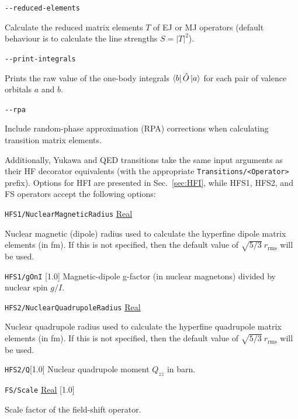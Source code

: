 \documentclass{report}
\begin{document}
\texttt{{-}{-}reduced-elements} 
\begin{adjustwidth}{1cm}{}
Calculate the reduced matrix elements $T$ of EJ or MJ operators (default behaviour is to calculate the line strengths 
$S = |T|^2$).
\end{adjustwidth}

\texttt{{-}{-}print-integrals} 
\begin{adjustwidth}{1cm}{}
Prints the raw value of the one-body integrals $\bra{b}\hat{O}\ket{a}$ for each pair of valence 
orbitals $a$ and $b$.
\end{adjustwidth}

\texttt{{-}{-}rpa}
\begin{adjustwidth}{1cm}{}
Include random-phase approximation (RPA) corrections when calculating transition matrix elements. 
\end{adjustwidth}

Additionally, Yukawa and QED transitions take the same input arguments as their HF decorator equivalents (with the appropriate \hbox{\texttt{Transitions/\textless{Operator}\textgreater}} prefix). Options for HFI are presented in Sec.~\ref{sec:HFI}, while HFS1, HFS2, and FS operators accept the following options:

\texttt{HFS1/NuclearMagneticRadius} \uline{Real}
\begin{adjustwidth}{1cm}{}
Nuclear magnetic (dipole) radius used to calculate the hyperfine dipole matrix elements (in fm). If this is not
specified, then the default value of $\sqrt{5/3} ~ r_{\textrm{rms}}$ will be used.
\end{adjustwidth}

\texttt{HFS1/gOnI} [1.0]
Magnetic-dipole g-factor (in nuclear magnetons) divided by nuclear spin $g/I$.

\texttt{HFS2/NuclearQuadrupoleRadius} \uline{Real}
\begin{adjustwidth}{1cm}{}
Nuclear quadrupole radius used to calculate the hyperfine quadrupole matrix elements (in fm). If this is not
specified, then the default value of $\sqrt{5/3} ~ r_{\textrm{rms}}$ will be used.
\end{adjustwidth}

\texttt{HFS2/Q}[1.0]
Nuclear quadrupole moment $Q_{zz}$ in barn.

\texttt{FS/Scale} \uline{Real} [1.0]
\begin{adjustwidth}{1cm}{}
Scale factor of the field-shift operator.
\end{adjustwidth}
\end{document}
